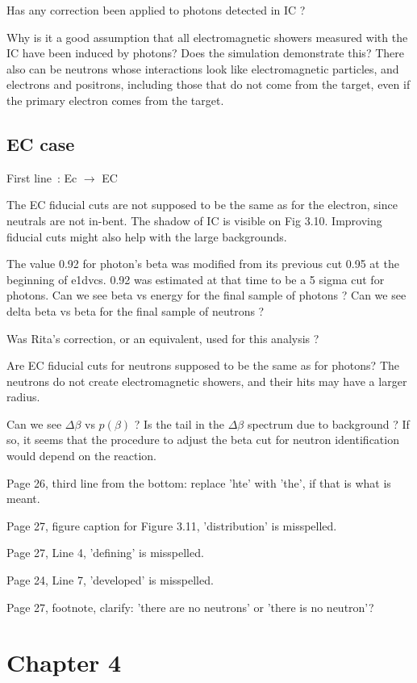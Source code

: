 \documentclass[11pt]{paper}
\begin{document}
Has any correction been applied to photons detected in IC ?

Why is it a good assumption that all electromagnetic showers measured with the IC have been induced by photons? Does the simulation demonstrate this? There also can be neutrons whose interactions look like electromagnetic particles, and electrons and positrons, including those that do not come from the target, even if the primary electron comes from the target.

\subsection*{EC case}

First line~: Ec $\rightarrow$ EC

The EC fiducial cuts are not supposed to be the same as for the electron, since neutrals are not in-bent.
The shadow of IC is visible on Fig 3.10.
Improving fiducial cuts might also help with the large backgrounds.

The value 0.92 for photon's beta was modified from its previous cut 0.95 at the beginning of e1dvcs.
0.92 was estimated at that time to be a 5 sigma cut for photons.
Can we see beta vs energy for the final sample of photons ?
Can we see delta beta vs beta for the final sample of neutrons ?

Was Rita's correction, or an equivalent, used for this analysis ?

Are EC fiducial cuts for neutrons supposed to be the same as for photons?
The neutrons do not create electromagnetic showers, and their hits may have a larger radius.

Can we see $\Delta\beta$ vs $p(\beta)$ ?
Is the tail in the $\Delta\beta$ spectrum due to background ?
If so, it seems that the procedure to adjust the beta cut for neutron identification would depend on the reaction.

Page 26, third line from the bottom: replace 'hte' with 'the', if that is what is meant.

Page 27, figure caption for Figure 3.11, 'distribution' is misspelled.

Page 27, Line 4, 'defining' is misspelled.

Page 24, Line 7, 'developed' is misspelled.

Page 27, footnote, clarify: 'there are no neutrons' or 'there is no neutron'?

\section*{Chapter 4}
\end{document}
